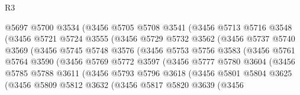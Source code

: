 \begin{lexlean}{R3}
\begin{coremodule}
                    @5697
                    @5700
                    @3534
                    (@3456
                      @5705
                      @5708
                      @3541
                      (@3456
                        @5713
                        @5716
                        @3548
                        (@3456
                          @5721
                          @5724
                          @3555
                          (@3456
                            @5729
                            @5732
                            @3562
                            (@3456
                              @5737
                              @5740
                              @3569
                              (@3456
                                @5745
                                @5748
                                @3576
                                (@3456
                                  @5753
                                  @5756
                                  @3583
                                  (@3456
                                    @5761
                                    @5764
                                    @3590
                                    (@3456
                                      @5769
                                      @5772
                                      @3597
                                      (@3456
                                        @5777
                                        @5780
                                        @3604
                                        (@3456
                                          @5785
                                          @5788
                                          @3611
                                          (@3456
                                            @5793
                                            @5796
                                            @3618
                                            (@3456
                                              @5801
                                              @5804
                                              @3625
                                              (@3456
                                                @5809
                                                @5812
                                                @3632
                                                (@3456
                                                  @5817
                                                  @5820
                                                  @3639
                                                  (@3456

\end{coremodule}
\end{lexlean}
